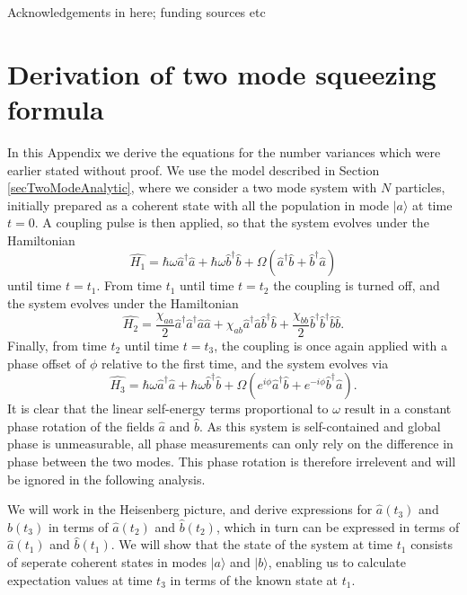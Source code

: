 \documentclass{iopart}
\begin{document}
\ack
Acknowledgements in here; funding sources etc

\clearpage

\appendix
\section{Derivation of two mode squeezing formula}
\label{appendixTwoModeDerivation}
In this Appendix we derive the equations for the number variances which were earlier stated without proof. We use the model described in Section \ref{secTwoModeAnalytic}, where we consider a two mode system with $N$ particles, initially prepared as a coherent state with all the population in mode $|a\rangle$ at time $t=0$. A coupling pulse is then applied, so that the system evolves under the Hamiltonian
\begin{equation}
\hat{H_1} = \hbar \omega \hat{a}^{\dagger} \hat{a} +  \hbar \omega \hat{b}^{\dagger} \hat{b} 
          + \Omega (\hat{a}^{\dagger} \hat{b} + \hat{b}^{\dagger} \hat{a} )
\end{equation}
until time $t=t_1$. From time $t_1$ until time $t=t_2$ the coupling is turned off, and the system evolves under the Hamiltonian
\begin{equation}
\hat{H_2} = \frac{\chi_{aa}}{2} \hat{a}^{\dagger} \hat{a}^{\dagger} \hat{a} \hat{a}
          + \chi_{ab} \hat{a}^{\dagger} \hat{a} \hat{b}^{\dagger} \hat{b}
          + \frac{\chi_{bb}}{2} \hat{b}^{\dagger} \hat{b}^{\dagger} \hat{b} \hat{b}.
\end{equation}
Finally, from time $t_2$ until time $t=t_3$, the coupling is once again applied with a phase offset of $\phi$ relative to the first time, and the system evolves via
\begin{equation}
\hat{H_3} = \hbar \omega \hat{a}^{\dagger} \hat{a} +  \hbar \omega \hat{b}^{\dagger} \hat{b}
          + \Omega (e^{i\phi} \hat{a}^{\dagger} \hat{b} + e^{-i\phi} \hat{b}^{\dagger} \hat{a} ).
\end{equation}
It is clear that the linear self-energy terms proportional to $\omega$ result in a constant phase rotation of the fields $\hat{a}$ and $\hat{b}$. As this system is self-contained and global phase is unmeasurable, all phase measurements can only rely on the difference in phase between the two modes. This phase rotation is therefore irrelevent and will be ignored in the following analysis.

We will work in the Heisenberg picture, and derive expressions for $\hat{a}(t_3)$ and $\hat{b}(t_3)$ in terms of $\hat{a}(t_2)$ and $\hat{b}(t_2)$, which in turn can be expressed in terms of $\hat{a}(t_1)$ and $\hat{b}(t_1)$. We will show that the state of the system at time $t_1$ consists of seperate coherent states in modes $|a\rangle$ and $|b\rangle$, enabling us to calculate expectation values at time $t_3$ in terms of the known state at $t_1$.
\end{document}
